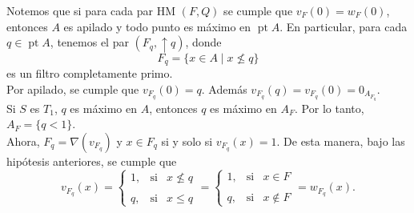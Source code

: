 \documentclass[11pt]{amsart}
\DeclareMathOperator{\pt}{pt}
\theoremstyle{plain}
\theoremstyle{definition}
\begin{document}
Notemos que si para cada par HM $(F, Q)$ se cumple que $v_F(0)=w_F(0)$, entonces $A$ es apilado y todo punto es máximo en $\pt A$.
En particular, para cada $q\in \pt A$, tenemos el par $(F_q, \uparrow q)$, donde 
\[
F_q=\{x\in A\mid x\nleq q\}
\]
es un filtro completamente primo.\\

Por apilado, se cumple que $v_{F_q}(0)=q$. Además $v_{F_q}(q)=v_{F_q}(0)=0_{A_{F_q}}$. \\

Si $S$ es $T_1$, $q$ es máximo en $A$, entonces $q$ es máximo en $A_F$.
Por lo tanto, $A_F=\{q<1\}$.\\

Ahora, $F_q=\nabla(v_{F_q})$ y $x\in F_q$ si y solo si $v_{F_q}(x)=1$. De esta manera, bajo las hipótesis anteriores, se cumple que 
\[
v_{F_q}(x)= \left\{ \begin{array}{lcc} 1, & \text{si}  &  x\nleq q\\ \\ q, & \text{si} & x\leq q 
\end{array} \right.=  \left\{ \begin{array}{lcc} 1, & \text{si}  &  x\in F\\ \\ q, & \text{si} & x\not\in F \end{array} \right.=w_{F_q}(x).
\]
\end{document}
